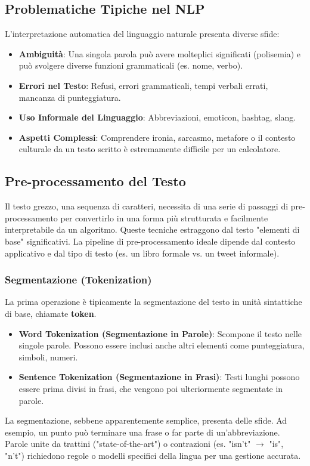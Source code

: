 \documentclass{article}
\begin{document}
\subsection{Problematiche Tipiche nel NLP}
L'interpretazione automatica del linguaggio naturale presenta diverse sfide:
\begin{itemize}
    \item \textbf{Ambiguità}: Una singola parola può avere molteplici significati (polisemia) e può svolgere diverse funzioni grammaticali (es. nome, verbo).
    \item \textbf{Errori nel Testo}: Refusi, errori grammaticali, tempi verbali errati, mancanza di punteggiatura.
    \item \textbf{Uso Informale del Linguaggio}: Abbreviazioni, emoticon, hashtag, slang.
    \item \textbf{Aspetti Complessi}: Comprendere ironia, sarcasmo, metafore o il contesto culturale da un testo scritto è estremamente difficile per un calcolatore.
\end{itemize}

\subsection{Pre-processamento del Testo}
Il testo grezzo, una sequenza di caratteri, necessita di una serie di passaggi di pre-processamento per convertirlo in una forma più strutturata e facilmente interpretabile da un algoritmo. Queste tecniche estraggono dal testo "elementi di base" significativi. La pipeline di pre-processamento ideale dipende dal contesto applicativo e dal tipo di testo (es. un libro formale vs. un tweet informale).

\subsubsection{Segmentazione (Tokenization)}
La prima operazione è tipicamente la segmentazione del testo in unità sintattiche di base, chiamate \textbf{token}.
\begin{itemize}
    \item \textbf{Word Tokenization (Segmentazione in Parole)}: Scompone il testo nelle singole parole. Possono essere inclusi anche altri elementi come punteggiatura, simboli, numeri.
    \item \textbf{Sentence Tokenization (Segmentazione in Frasi)}: Testi lunghi possono essere prima divisi in frasi, che vengono poi ulteriormente segmentate in parole.
\end{itemize}
La segmentazione, sebbene apparentemente semplice, presenta delle sfide. Ad esempio, un punto può terminare una frase o far parte di un'abbreviazione. Parole unite da trattini ("state-of-the-art") o contrazioni (es. "isn't" $\rightarrow$ "is", "n't") richiedono regole o modelli specifici della lingua per una gestione accurata.
\end{document}

